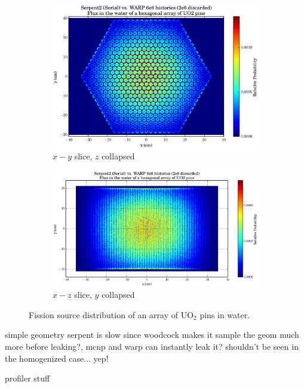 \begin{figure}[h!]
\centering
\begin{subfigure}{.5\textwidth}
  \centering
  \includegraphics[width=\linewidth]{graphics/finalresults/assembly_fiss1.eps}
  \caption{$x-y$ slice, $z$ collapsed}
  \label{fig:sub1}
\end{subfigure}%
\begin{subfigure}{.5\textwidth}
  \centering
  \includegraphics[width=\linewidth]{graphics/finalresults/assembly_fiss2.eps}
  \caption{$x-z$ slice, $y$ collapsed}
  \label{fig:sub2}
\end{subfigure}
\caption{Fission source distribution of an array of UO$_2$ pins in water. \label{assembly_fiss} }
\end{figure}



simple geometry serpent is slow since woodcock makes it sample the geom much more before leaking?, mcnp and warp can instantly leak it?  shouldn't be seen in the homogenized case... yep!


profiler stuff

